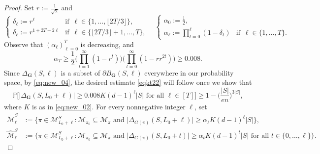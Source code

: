 \documentclass[11pt,leqno]{amsart}
\theoremstyle{remark}
\theoremstyle{plain}
\begin{document}
\begin{proof}
Set $r:=\frac{1}{\sqrt{2}}$ and
\begin{equation} \label{e-pap-p3}
\begin{cases}
\delta_\ell := r^{\ell} & \text{if } \, \ell\in \big\{1,\dots,\lfloor 2T/3 \rfloor\big\}, \\
\delta_\ell :=  r^{1+2T-2\ell} & \text{if } \, \ell\in \big\{ \lfloor 2T/3 \rfloor+1,\dots,T\big\},
\end{cases}
\ \ \ \
\begin{cases}
\alpha_0:=\frac{1}{2}, \\
\alpha_\ell := \prod_{t=0}^{\ell}(1-\delta_t) & \text{if } \, \ell\in \{1,\dots,T\}.
\end{cases}
\end{equation}
Observe that $(\alpha_\ell)_{\ell=0}^T$ is decreasing, and
\begin{equation} \label{"douleia"}
\alpha_T\geqslant \frac{1}{2}\Big(\prod_{t=1}^{\infty}(1-r^t)\Big)
\Big(\prod_{t=0}^{\infty}(1-r r^{2t})\Big) \geqslant 0.008.
\end{equation}
Since $\Delta_{\mathbf{G}}(S,\ell)$ is a subset of $\partial B_{\mathbf{G}}(S,\ell)$ everywhere
in our probability space, by \eqref{eq:new_04}, the desired estimate \eqref{eqkt22} will follow once we show that
\begin{equation} \label{eqkt23}
\mathbb{P}\Big[ \big|\Delta_{\mathbf{G}}(S,L_0+\ell)\big| \geqslant
0.008 K (d-1)^\ell |S| \text{ for all } \ell\in [T]\Big]\geqslant 1- \Big(\frac{|S|}{en}\Big)^{3|S|},
\end{equation}
where $K$ is as in \eqref{eq:new_02}. For every nonnegative integer $\ell$, set
\begin{align*}
\widetilde{\mathcal{M}}^S_\ell & := \big\{ \pi\in\mathcal{M}^S_{L_0+\ell}\colon
\mathcal{M}_{\pi_0}\subseteq\mathcal{M}_\pi\text{ and }
\big| \Delta_{G(\pi)}(S,L_0+\ell)\big| \geqslant \alpha_\ell K (d-1)^\ell|S|\big\}, \\
\widehat{\mathcal{M}}^S_\ell & := \big\{\pi\in\mathcal{M}^S_{L_0+\ell} \colon
\mathcal{M}_{\pi_0}\subseteq\mathcal{M}_\pi\text{ and }
\big|\Delta_{G(\pi)}(S,L_0+t)\big| \geqslant \alpha_t K (d-1)^t|S| \text{ for all } t\in\{0,\dots,\ell\}\big\}.
\end{align*}

\end{proof}
\end{document}
